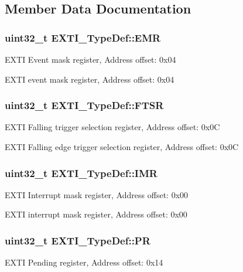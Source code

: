 \subsection{Member Data Documentation}
\hypertarget{struct_e_x_t_i___type_def_a9c5bff67bf9499933959df7eb91a1bd6}{
\subsubsection[{E\-M\-R}]{ uint32\-\_\-t E\-X\-T\-I\-\_\-\-Type\-Def\-::\-E\-M\-R}}\label{struct_e_x_t_i___type_def_a9c5bff67bf9499933959df7eb91a1bd6}
E\-X\-T\-I Event mask register, Address offset\-: 0x04

E\-X\-T\-I event mask register, Address offset\-: 0x04 \hypertarget{struct_e_x_t_i___type_def_aee667dc148250bbf37fdc66dc4a9874d}{
\subsubsection[{F\-T\-S\-R}]{ uint32\-\_\-t E\-X\-T\-I\-\_\-\-Type\-Def\-::\-F\-T\-S\-R}}\label{struct_e_x_t_i___type_def_aee667dc148250bbf37fdc66dc4a9874d}
E\-X\-T\-I Falling trigger selection register, Address offset\-: 0x0\-C

E\-X\-T\-I Falling edge trigger selection register, Address offset\-: 0x0\-C \hypertarget{struct_e_x_t_i___type_def_a17d061db586d4a5aa646b68495a8e6a4}{
\subsubsection[{I\-M\-R}]{ uint32\-\_\-t E\-X\-T\-I\-\_\-\-Type\-Def\-::\-I\-M\-R}}\label{struct_e_x_t_i___type_def_a17d061db586d4a5aa646b68495a8e6a4}
E\-X\-T\-I Interrupt mask register, Address offset\-: 0x00

E\-X\-T\-I interrupt mask register, Address offset\-: 0x00 \hypertarget{struct_e_x_t_i___type_def_a133294b87dbe6a01e8d9584338abc39a}{
\subsubsection[{P\-R}]{ uint32\-\_\-t E\-X\-T\-I\-\_\-\-Type\-Def\-::\-P\-R}}\label{struct_e_x_t_i___type_def_a133294b87dbe6a01e8d9584338abc39a}
E\-X\-T\-I Pending register, Address offset\-: 0x14

